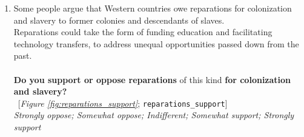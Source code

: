 \begin{enumerate}[resume]
\item  \label{q:reparations_support} Some people argue that Western countries owe reparations for colonization and slavery to former colonies and descendants of slaves. \\Reparations could take the form of funding education and facilitating technology transfers, to address unequal opportunities passed down from the past. \\\\\textbf{Do you support or oppose reparations} of this kind \textbf{for colonization and slavery?~}\\ 
~[\textit{Figure \ref{fig:reparations_support}}; 
\verb|reparations_support|]
  \\ \textit{Strongly oppose; Somewhat oppose; Indifferent; Somewhat support; Strongly support}

\end{enumerate} 

